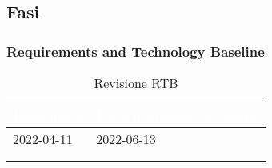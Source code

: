 \subsection{Fasi} 
{
    \subsubsection{Requirements and Technology Baseline} 
    {
        \setlength{\freewidth}{\dimexpr\textwidth-30\tabcolsep}
        \renewcommand{\arraystretch}{1.0}
        \setlength{\aboverulesep}{0pt}
        \setlength{\belowrulesep}{0pt}
        \begin{longtable}{C{.4\freewidth} C{.4\freewidth}}
        \toprule
        \textcolor{white}{\textbf{Data inizio}}&
        \textcolor{white}{\textbf{Data previsione revisione}} \\
        \toprule
        \endhead
            
        2022-04-11 & 2022-06-13 \\
        \bottomrule
        \\
        \caption{Revisione RTB}
        \end{longtable}
    
}}
